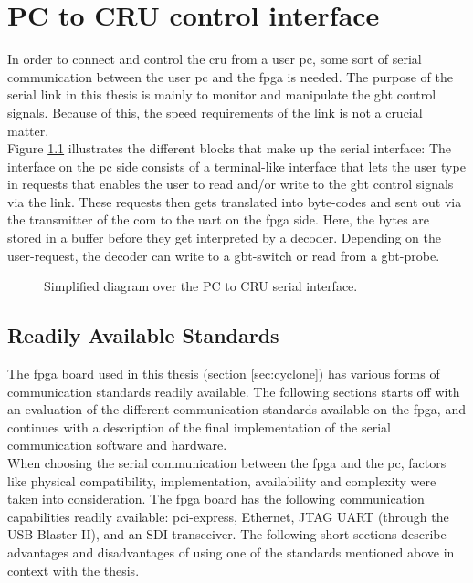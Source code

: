 \documentclass[main.tex]{subfiles}
\begin{document}
\chapter{PC to CRU control interface} \label{chap:sercom}

In order to connect and control the \gls{cru} from a user \acrshort{pc}, some sort of serial communication between the user \acrshort{pc} and the \gls{fpga} is needed. The purpose of the serial link in this thesis is mainly to monitor and manipulate the \gls{gbt} control signals. Because of this, the speed requirements of the link is not a crucial matter. \\
Figure \ref{fig:sergui} illustrates the different blocks that make up the serial interface: The interface on the \acrshort{pc} side consists of a terminal-like interface that lets the user type in requests that enables the user to read and/or write to the \gls{gbt} control signals via the link. These requests then gets translated into byte-codes and sent out via the transmitter of the \gls{com} to the \gls{uart} on the fpga side. Here, the bytes are stored in a buffer before they get interpreted by a decoder. Depending on the user-request, the decoder can write to a \gls{gbt}-switch or read from a \gls{gbt}-probe.

\begin{figure} %

\caption{Simplified diagram over the PC to CRU serial interface.}
\label{fig:sergui}
\end{figure}

\section{Readily Available Standards}
The \gls{fpga} board used in this thesis (section \ref{sec:cyclone}) has various forms of communication standards readily available. The following sections starts off with an evaluation of the different communication standards available on the \gls{fpga}, and continues with a description of the final implementation of the serial communication software and hardware.\\

When choosing the serial communication between the \gls{fpga} and the \acrshort{pc}, factors like physical compatibility, implementation, availability and complexity were taken into consideration. The \gls{fpga} board has the following communication capabilities readily available: \gls{pci}-express, Ethernet, JTAG UART (through the USB Blaster II), and an SDI-transceiver. The following short sections describe advantages and disadvantages of using one of the standards mentioned above in context with the thesis.
\end{document}
